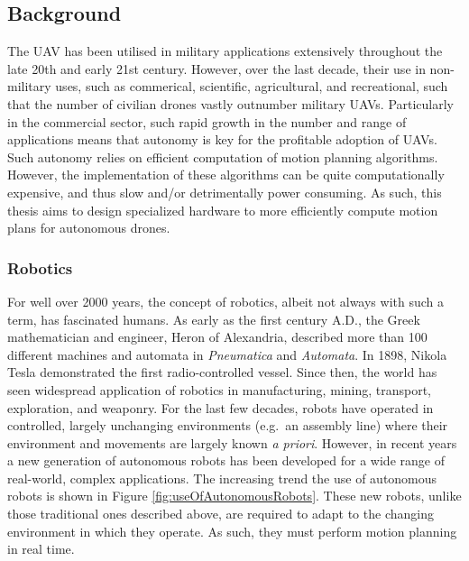 
\subsection{Background}
    
    The \ac{UAV} has been utilised in military applications extensively throughout the late 20th and early 21st century. However, over the last decade, their use in non-military uses, such as commerical, scientific, agricultural, and recreational, such that the number of civilian drones vastly outnumber military \ac{UAV}s. Particularly in the commercial sector, such rapid growth in the number and range of applications means that autonomy is key for the profitable adoption of \ac{UAV}s. Such autonomy relies on efficient computation of motion planning algorithms. However, the implementation of these algorithms can be quite computationally expensive, and thus slow and/or detrimentally power consuming. As such, this thesis aims to design specialized hardware to more efficiently compute motion plans for autonomous drones.

    \subsubsection*{Robotics}
        For well over 2000 years, the concept of robotics, albeit not always with such a term, has fascinated humans. As early as the first century A.D., the Greek mathematician and engineer, Heron of Alexandria, described more than 100 different machines and automata in \textit{Pneumatica} and \textit{Automata}\cite{Alexandrinus}. In 1898, Nikola Tesla demonstrated the first radio-controlled vessel. Since then, the world has seen widespread application of robotics in manufacturing, mining, transport, exploration, and weaponry. For the last few decades, robots have operated in controlled, largely unchanging environments (e.g.\ an assembly line) where their environment and movements are largely known \textit{a priori}.
        \newline
        However, in recent years a new generation of autonomous robots has been developed for a wide range of real-world, complex applications. The increasing trend the use of autonomous robots is shown in Figure \ref{fig:useOfAutonomousRobots}. These new robots, unlike those traditional ones described above, are required to adapt to the changing environment in which they operate. As such, they must perform motion planning in real time.

